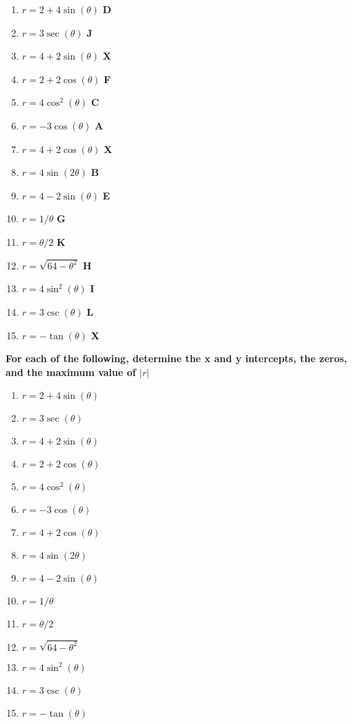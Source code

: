 \documentclass[12pt]{exam}
\begin{document}
\newcommand\aline[1]{\textbf{ #1  } }
\vspace{2ex}
\begin{multicols}{3}
	\begin{enumerate}
		\item $r = 2+4\sin(\theta)$ \aline{D} %
		\item $r = 3\sec(\theta)$ \aline{J} %
		\item $r = 4 + 2 \sin(\theta)$ \aline{X}
		\item $r=2+2\cos(\theta)$ \aline{F} %
		\item $r = 4\cos^2(\theta)$ \aline{C} %
		\item $r = -3\cos(\theta)$ \aline{A} %
		\item $r  = 4 + 2 \cos(\theta)$ \aline{X}
		\item $r = 4\sin(2\theta)$ \aline{B} %
		\item $r=4-2\sin(\theta)$ \aline{E} %
		\item $r=1/\theta$ \aline{G} %
		\item $r = \theta/2$ \aline{K} %
		\item $r = \sqrt{64-\theta^2}$ \aline{H} %
		\item $r = 4\sin^2(\theta)$ \aline{I} %
		\item $r = 3\csc(\theta)$ \aline{L} %
		\item $r = -\tan(\theta)$ \aline{X}
	\end{enumerate}
	\end{multicols}
\clearpage

\textbf{For each of the following, determine the x and y intercepts, the
 zeros, and the maximum value of $|r|$}
 \begin{multicols}{2}
 \begin{enumerate}
	\setlength{\itemsep}{12ex}
	\item $r = 2+4\sin(\theta)$  %
	\item $r = 3\sec(\theta)$  %
	\item $r = 4 + 2 \sin(\theta)$
	\item $r=2+2\cos(\theta)$  %
	\item $r = 4\cos^2(\theta)$  %
	\item $r = -3\cos(\theta)$  %
	\item $r  = 4 + 2 \cos(\theta)$
	\item $r = 4\sin(2\theta)$  %
	\item $r=4-2\sin(\theta)$  %
	\item $r=1/\theta$  %
	\item $r = \theta/2$  %
	\item $r = \sqrt{64-\theta^2}$  %
	\item $r = 4\sin^2(\theta)$  %
	\item $r = 3\csc(\theta)$  %
	\item $r = -\tan(\theta)$
\end{enumerate}
\end{multicols}
\end{document}
